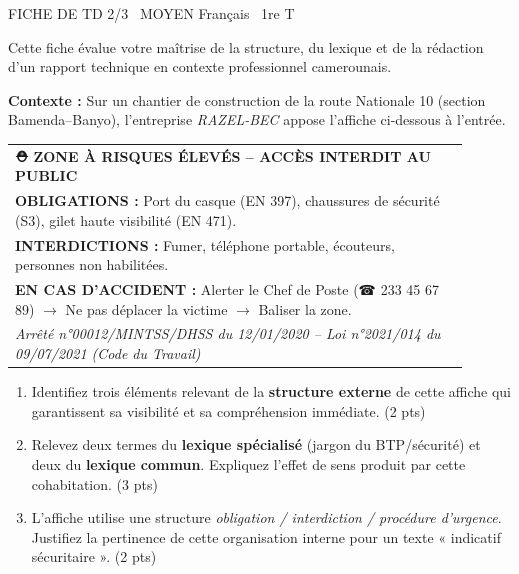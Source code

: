 \documentclass[11pt]{article}
\begin{document}
\begin{tcolorbox}[enhanced,colback=popink,colframe=popink,arc=10pt,boxrule=0pt,left=12pt,right=12pt,top=9pt,bottom=9pt]
{\color{white}\popxbold\small FICHE DE TD 2/3 \textbullet\ MOYEN \hfill Français \textbullet\ 1re T\par}
\end{tcolorbox}
\vspace{4pt}

Cette fiche évalue votre maîtrise de la structure, du lexique et de la rédaction d'un rapport technique en contexte professionnel camerounais.

\begin{exercice}
    \textbf{Contexte :} Sur un chantier de construction de la route Nationale 10 (section Bamenda--Banyo), l'entreprise \textit{RAZEL-BEC} appose l'affiche ci-dessous à l'entrée.
    
    \begin{center}
    \begin{tabular}{|p{0.9\linewidth}|}
    \hline
    \textbf{⛑️ ZONE À RISQUES ÉLEVÉS -- ACCÈS INTERDIT AU PUBLIC} \\
    \textbf{OBLIGATIONS :} Port du casque (EN 397), chaussures de sécurité (S3), gilet haute visibilité (EN 471). \\
    \textbf{INTERDICTIONS :} Fumer, téléphone portable, écouteurs, personnes non habilitées. \\
    \textbf{EN CAS D'ACCIDENT :} Alerter le Chef de Poste (☎ 233 45 67 89) $\rightarrow$ Ne pas déplacer la victime $\rightarrow$ Baliser la zone. \\
    \textit{Arrêté n°00012/MINTSS/DHSS du 12/01/2020 -- Loi n°2021/014 du 09/07/2021 (Code du Travail)} \\
    \hline
    \end{tabular}
    \end{center}
    
    \begin{enumerate}
        \item Identifiez trois éléments relevant de la \textbf{structure externe} de cette affiche qui garantissent sa visibilité et sa compréhension immédiate. (2 pts)
        \item Relevez deux termes du \textbf{lexique spécialisé} (jargon du BTP/sécurité) et deux du \textbf{lexique commun}. Expliquez l'effet de sens produit par cette cohabitation. (3 pts)
        \item L'affiche utilise une structure \textit{obligation / interdiction / procédure d'urgence}. Justifiez la pertinence de cette organisation interne pour un texte « indicatif sécuritaire ». (2 pts)
    \end{enumerate}
\end{exercice}
\end{document}
